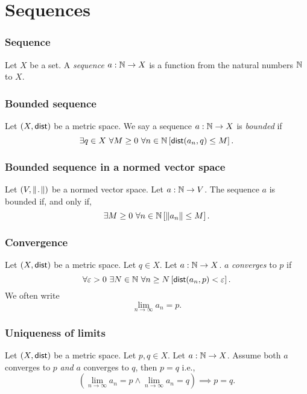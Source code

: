 \section*{Sequences}


\subsubsection*{Sequence}
\udef Let $X$ be a set. A \emph{sequence} $a : \mathbb{N} \to X$ is a function
from the natural numbers $\mathbb{N}$ to $X$.


\subsubsection*{Bounded sequence}
\udef Let $(X, \mathsf{dist})$ be a metric space.
We say a sequence $a : \mathbb{N} \to X$ is \emph{bounded} if
\[
    \exists q \in X\ \forall M \geq 0\ \forall n \in \N \left[ 
    \dist(a_n, q) \leq M \right].
\]


\subsubsection*{Bounded sequence in a normed vector space}
\udef Let $(V, \norm)$ be a normed vector space.
Let $a : \mathbb{N} \to V$. The sequence $a$ is bounded if, and only if,
\[
    \exists M \geq 0\ \forall n \in \mathbb{N} \left[ \| a_n \| \leq M \right].
\]


\subsubsection*{Convergence}
Let $(X, \mathsf{dist})$ be a metric space. Let $q \in X$. Let $a : \mathbb{N} \to X$.
$a$ \emph{converges} to $p$ if
\[
    \forall \varepsilon > 0\ \exists N \in \mathbb{N}\ \forall n \geq N \left[
    \mathsf{dist}(a_n,p) < \varepsilon \right].
\]
We often write
\[
    \lim_{n \to \infty}a_n = p.
\]


\subsubsection*{Uniqueness of limits}
Let $(X, \mathsf{dist})$ be a metric space. Let $p,q \in X$. Let $a : \mathbb{N} \to X$.
Assume both $a$ converges to $p$ \emph{and} $a$ converges to $q$, then $p = q$ i.e.,
\[
    \left( \lim_{n \to \infty} a_n = p \land \lim_{n \to \infty} a_n = q \right)
    \implies p = q.
\]


